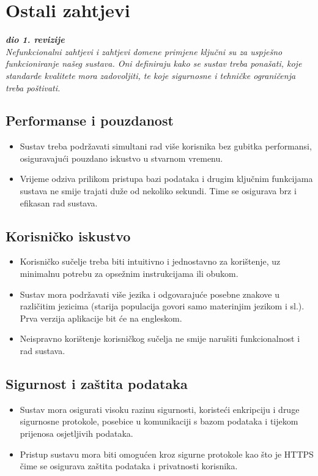 \section{Ostali zahtjevi}


\textbf{\textit{dio 1. revizije}}\\

\textit{Nefunkcionalni zahtjevi i zahtjevi domene primjene ključni su za uspješno funkcioniranje našeg sustava. Oni definiraju kako se sustav treba ponašati, koje standarde kvalitete mora zadovoljiti, te koje sigurnosne i tehničke ograničenja treba poštivati.}

\subsection*{Performanse i pouzdanost}
\begin{itemize}
    \item Sustav treba podržavati simultani rad više korisnika bez gubitka performansi, osiguravajući pouzdano iskustvo u stvarnom vremenu.
    \item Vrijeme odziva prilikom pristupa bazi podataka i drugim ključnim funkcijama sustava ne smije trajati duže od nekoliko sekundi. Time se osigurava brz i efikasan rad sustava.
\end{itemize}

\subsection*{Korisničko iskustvo}
\begin{itemize}
    \item Korisničko sučelje treba biti intuitivno i jednostavno za korištenje, uz minimalnu potrebu za opsežnim instrukcijama ili obukom.
    \item Sustav mora podržavati više jezika i odgovarajuće posebne znakove u različitim jezicima (starija populacija govori samo materinjim jezikom i sl.). Prva verzija aplikacije bit će na engleskom. 
    \item Neispravno korištenje korisničkog sučelja ne smije narušiti funkcionalnost i rad sustava.
\end{itemize}

\subsection*{Sigurnost i zaštita podataka}
\begin{itemize}
    \item Sustav mora osigurati visoku razinu sigurnosti, koristeći enkripciju i druge sigurnosne protokole, posebice u komunikaciji s bazom podataka i tijekom prijenosa osjetljivih podataka.
    \item Pristup sustavu mora biti omogućen kroz sigurne protokole kao što je HTTPS čime se osigurava zaštita podataka i privatnosti korisnika.
\end{itemize}

